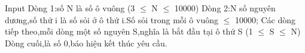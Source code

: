 Input
Dòng 1:số N là số ô vuông (3 $\le$ N $\le$ 10000) Dòng 2:N số nguyên dương,số thứ i là số sỏi ở ô thứ i.Số sỏi trong mỗi ô vuông  $\le$ 10000; Các dòng tiếp theo,mỗi dòng một số nguyên S,nghĩa là bắt đầu tại ô thứ S (1 $\le$ S $\le$ N) Dòng cuối,là số 0,báo hiệu kết thúc yêu cầu.